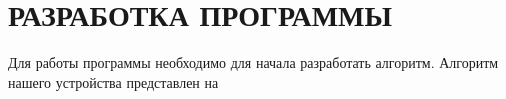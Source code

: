 \begin{sloppypar} %
\newpage %
\section{РАЗРАБОТКА ПРОГРАММЫ} %

Для работы программы необходимо для начала разработать алгоритм. Алгоритм нашего устройства представлен на 




\end{sloppypar}
